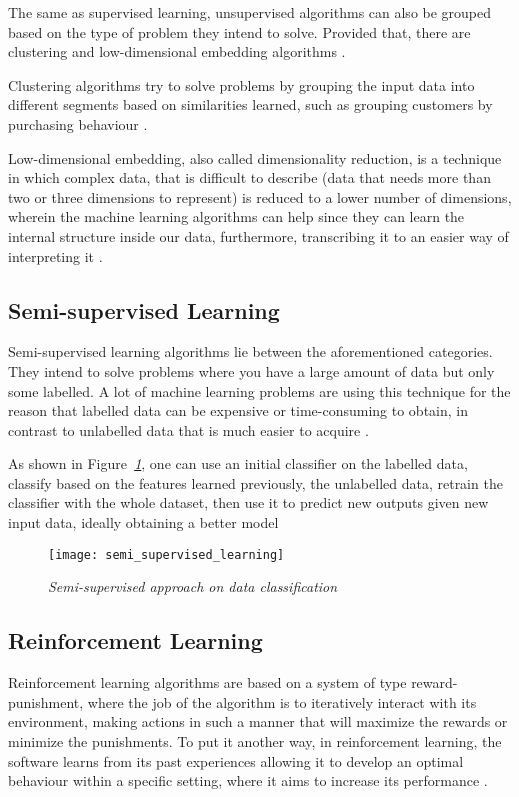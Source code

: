 The same as supervised learning, unsupervised algorithms can also be grouped
based on the type of problem they intend to solve. Provided that,
there are clustering and low-dimensional embedding algorithms \cite{amai}.

Clustering algorithms try to solve problems by grouping the input data
into different segments based on similarities learned,
such as grouping customers by purchasing behaviour \cite{brownlee2016master}.


Low-dimensional embedding, also called dimensionality reduction,
is a technique in which complex data, that is difficult to describe
(data that needs more than two or three dimensions to represent)
is reduced to a lower number of dimensions,
wherein the machine learning algorithms can help
since they can learn the internal structure inside our data, furthermore,
transcribing it to an easier way of interpreting it \cite{amai}.


\subsection{Semi-supervised Learning}
Semi-supervised learning algorithms lie between the aforementioned categories.
They intend to solve problems where you have a large amount of data but only some labelled.
A lot of machine learning problems are using this technique for the reason that
labelled data can be expensive or time-consuming to obtain,
in contrast to unlabelled data that is much easier to acquire \cite{brownlee2016master}.

As shown in Figure\emph{~\ref{fig:semi_supervised_learning}}, one can use an initial classifier on the labelled data,
classify based on the features learned previously, the unlabelled data,
retrain the classifier with the whole dataset,
then use it to predict new outputs given new input data, ideally obtaining a better model \cite{lotte2015}

\begin{figure}[h]
    \centering
    \texttt{[image: semi\_supervised\_learning]}
    \caption{\emph{Semi-supervised approach on data classification \cite{lotte2015}}}
    \label{fig:semi_supervised_learning}
\end{figure}

\subsection{Reinforcement Learning}
Reinforcement learning algorithms are based on a system of type reward-punishment,
where the job of the algorithm is to iteratively interact with its environment,
making actions in such a manner that will maximize the rewards or minimize the punishments.
To put it another way, in reinforcement learning,
the software learns from its past experiences allowing it to develop an optimal
behaviour within a specific setting, where it aims to increase its performance \cite{typesMLMedium}.

